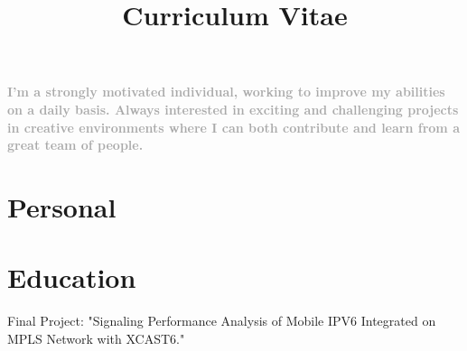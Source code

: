 \documentclass[10pt, a4paper]{moderncv}
\title{Curriculum Vitae}
\begin{document}
\maketitle

\begin{small}
\textcolor{darkgray}{
\textbf{I'm a strongly motivated individual, working to improve my abilities on a daily basis. Always interested in exciting and challenging projects in creative environments where I can
both contribute and learn from a great team of people.}}
\end{small}

\section{Personal}

\section{Education}
{
\begin{scriptsize}
Final Project: "Signaling Performance Analysis of Mobile IPV6 Integrated on MPLS Network with XCAST6."\\
\end{scriptsize}
}  %

\end{document}
